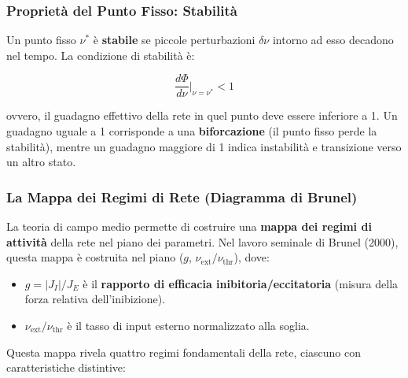\subsubsection{Proprietà del Punto Fisso: Stabilità}

Un punto fisso $\nu^*$ è \textbf{stabile} se piccole perturbazioni $\delta\nu$ intorno ad esso decadono nel tempo. La condizione di stabilità è:

\begin{equation}
\frac{d\Phi}{d\nu}\bigg|_{\nu = \nu^*} < 1
\end{equation}

ovvero, il guadagno effettivo della rete in quel punto deve essere inferiore a 1. Un guadagno uguale a 1 corrisponde a una \textbf{biforcazione} (il punto fisso perde la stabilità), mentre un guadagno maggiore di 1 indica instabilità e transizione verso un altro stato.

\subsubsection{La Mappa dei Regimi di Rete (Diagramma di Brunel)}

La teoria di campo medio permette di costruire una \textbf{mappa dei regimi di attività} della rete nel piano dei parametri. Nel lavoro seminale di Brunel (2000), questa mappa è costruita nel piano ($g$, $\nu_{\text{ext}}/\nu_{\text{thr}}$), dove:

\begin{itemize}
    \item $g = |J_I|/J_E$ è il \textbf{rapporto di efficacia inibitoria/eccitatoria} (misura della forza relativa dell'inibizione).
    \item $\nu_{\text{ext}}/\nu_{\text{thr}}$ è il tasso di input esterno normalizzato alla soglia.
\end{itemize}

Questa mappa rivela quattro regimi fondamentali della rete, ciascuno con caratteristiche distintive:

